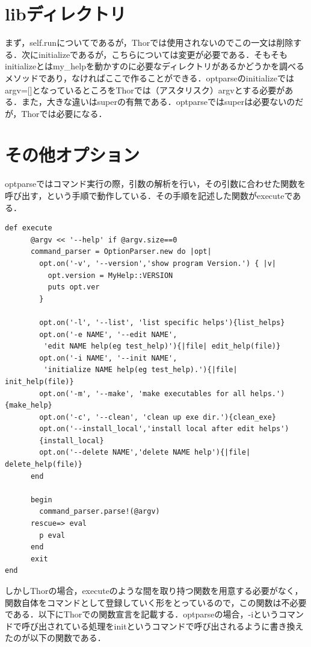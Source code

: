 \section{libディレクトリ}\label{libux30c7ux30a3ux30ecux30afux30c8ux30ea}

まず，self.runについてであるが，Thorでは使用されないのでこの一文は削除する．次にinitializeであるが，こちらについては変更が必要である．そもそもinitializeとはmy\_helpを動かすのに必要なディレクトリがあるかどうかを調べるメソッドであり，なければここで作ることができる．optparseのinitializeではargv={[}{]}となっているところをThorでは（アスタリスク）argvとする必要がある．また，大きな違いはsuperの有無である．optparseではsuperは必要ないのだが，Thorでは必要になる．

\section{その他オプション}\label{ux305dux306eux4ed6ux30aaux30d7ux30b7ux30e7ux30f3}

optparseではコマンド実行の際，引数の解析を行い，その引数に合わせた関数を呼び出す，という手順で動作している．その手順を記述した関数がexecuteである．


\begin{screen}
{\small
\begin{verbatim}
def execute
      @argv << '--help' if @argv.size==0
      command_parser = OptionParser.new do |opt|
        opt.on('-v', '--version','show program Version.') { |v|
          opt.version = MyHelp::VERSION
          puts opt.ver
        }
        
        opt.on('-l', '--list', 'list specific helps'){list_helps}
        opt.on('-e NAME', '--edit NAME',
         'edit NAME help(eg test_help)'){|file| edit_help(file)}
        opt.on('-i NAME', '--init NAME',
         'initialize NAME help(eg test_help).'){|file| init_help(file)}
        opt.on('-m', '--make', 'make executables for all helps.'){make_help}
        opt.on('-c', '--clean', 'clean up exe dir.'){clean_exe}
        opt.on('--install_local','install local after edit helps')
        {install_local}
        opt.on('--delete NAME','delete NAME help'){|file| delete_help(file)}
      end
      
      begin
        command_parser.parse!(@argv)
      rescue=> eval
        p eval
      end
      exit
end
\end{verbatim}}
\end{screen}

しかしThorの場合，executeのような間を取り持つ関数を用意する必要がなく，関数自体をコマンドとして登録していく形をとっているので，この関数は不必要である．以下にThorでの関数宣言を記載する．optparseの場合，-iというコマンドで呼び出されている処理をinitというコマンドで呼び出されるように書き換えたのが以下の関数である．


